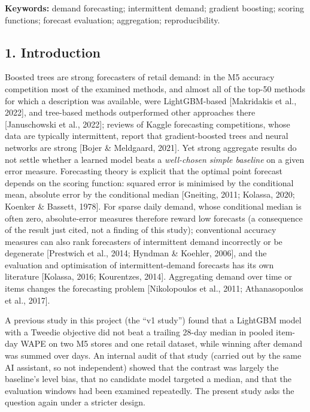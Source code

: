 \documentclass[
]{article}
\begin{document}
\textbf{Keywords:} demand forecasting; intermittent demand; gradient
boosting; scoring functions; forecast evaluation; aggregation;
reproducibility.

\subsection{1. Introduction}\label{introduction}

Boosted trees are strong forecasters of retail demand: in the M5
accuracy competition most of the examined methods, and almost all of the
top-50 methods for which a description was available, were
LightGBM-based {[}Makridakis et al., 2022{]}, and tree-based methods
outperformed other approaches there {[}Januschowski et al., 2022{]};
reviews of Kaggle forecasting competitions, whose data are typically
intermittent, report that gradient-boosted trees and neural networks are
strong {[}Bojer \& Meldgaard, 2021{]}. Yet strong aggregate results do
not settle whether a learned model beats a \emph{well-chosen simple
baseline} on a given error measure. Forecasting theory is explicit that
the optimal point forecast depends on the scoring function: squared
error is minimised by the conditional mean, absolute error by the
conditional median {[}Gneiting, 2011; Kolassa, 2020; Koenker \& Bassett,
1978{]}. For sparse daily demand, whose conditional median is often
zero, absolute-error measures therefore reward low forecasts (a
consequence of the result just cited, not a finding of this study);
conventional accuracy measures can also rank forecasters of intermittent
demand incorrectly or be degenerate {[}Prestwich et al., 2014; Hyndman
\& Koehler, 2006{]}, and the evaluation and optimisation of
intermittent-demand forecasts has its own literature {[}Kolassa, 2016;
Kourentzes, 2014{]}. Aggregating demand over time or items changes the
forecasting problem {[}Nikolopoulos et al., 2011; Athanasopoulos et al.,
2017{]}.

A previous study in this project (the ``v1 study'') found that a
LightGBM model with a Tweedie objective did not beat a trailing 28-day
median in pooled item-day WAPE on two M5 stores and one retail dataset,
while winning after demand was summed over days. An internal audit of
that study (carried out by the same AI assistant, so not independent)
showed that the contrast was largely the baseline's level bias, that no
candidate model targeted a median, and that the evaluation windows had
been examined repeatedly. The present study asks the question again
under a stricter design.
\end{document}
